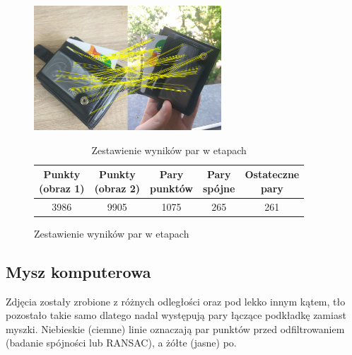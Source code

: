 \documentclass[../main.tex]{subfiles}
\begin{document}
    \begin{figure}[H]
    \centering
    \begin{minipage}{.5\textwidth}
        \caption{Wynik metody RANSAC}
        \centering
        \includegraphics[width=7cm]{wallet_pairs_ranscons_out}
    \end{minipage}%
    \begin{minipage}{.5\textwidth}
            \begin{table}[H]
            \caption{Zestawienie wyników par w etapach}
            \label{t:wallet}
            \begin{center}
            \begin{tabular}{|c|c|c|c|c|} 
            \hline
            \thead{Punkty \\ (obraz 1)} & \thead{Punkty \\ (obraz 2)} & 
            \thead{Pary \\ punktów} & \thead{Pary \\ spójne} &
            \thead{Ostateczne \\ pary} \\
            \hline
            {3986} & {9905} & {1075} & {265} & {261} \\
            \hline
            \end{tabular}
            \end{center}
            \end{table}
    \end{minipage}%
    \end{figure}
    
    \subsection{Mysz komputerowa}
     Zdjęcia zostały zrobione z różnych odległości oraz pod lekko innym kątem, tło pozostało takie samo dlatego nadal występują pary łączące podkładkę zamiast myszki. Niebieskie (ciemne)  linie oznaczają par punktów przed odfiltrowaniem (badanie spójności lub RANSAC), a żółte (jasne) po.
    
\end{document}
